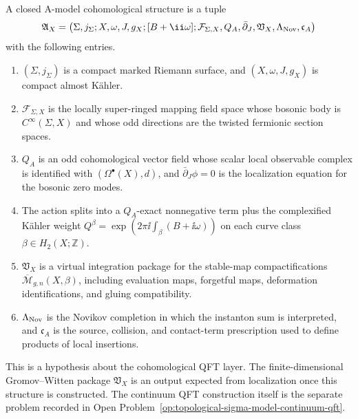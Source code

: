 \begin{hypothesis}
\label{hyp:a-model-cohomological-sigma-datum}
A closed A-model cohomological structure is a tuple
\[
  \mathfrak A_X
  =
  \bigl(
    \Sigma,j_\Sigma; X,\omega,J,g_X; [B+\ii\omega];
    \mathcal F_{\Sigma,X},Q_A,\bar\partial_J,
    \mathfrak V_X,\Lambda_{\rm Nov},\mathfrak c_A
  \bigr)
\]
with the following entries.
\begin{enumerate}[label=\textnormal{(\roman*)}]
\item \((\Sigma,j_\Sigma)\) is a compact marked Riemann surface, and
  \((X,\omega,J,g_X)\) is compact almost K\"ahler.
\item \(\mathcal F_{\Sigma,X}\) is the locally super-ringed mapping field
  space whose bosonic body is \(C^\infty(\Sigma,X)\) and whose odd
  directions are the twisted fermionic section spaces.
\item \(Q_A\) is an odd cohomological vector field whose scalar local
  observable complex is identified with \((\Omega^\bullet(X),d)\), and
  \(\bar\partial_J\phi=0\) is the localization equation for the bosonic
  zero modes.
\item The action splits into a \(Q_A\)-exact nonnegative term plus the
  complexified K\"ahler weight
  \(Q^\beta=\exp(2\pi\ii\int_\beta(B+\ii\omega))\) on each curve class
  \(\beta\in H_2(X;\mathbb Z)\).
\item \(\mathfrak V_X\) is a virtual integration package for the stable-map
  compactifications \(\overline{\mathcal M}_{g,n}(X,\beta)\), including
  evaluation maps, forgetful maps, deformation identifications, and gluing
  compatibility.
\item \(\Lambda_{\rm Nov}\) is the Novikov completion in which the instanton
  sum is interpreted, and \(\mathfrak c_A\) is the source, collision, and
  contact-term prescription used to define products of local insertions.
\end{enumerate}
This is a hypothesis about the cohomological QFT layer.  The
finite-dimensional Gromov--Witten package \(\mathfrak V_X\) is an output
expected from localization once this structure is constructed.  The continuum QFT
construction itself is the separate problem recorded in
Open Problem~\ref{op:topological-sigma-model-continuum-qft}.
\end{hypothesis}

